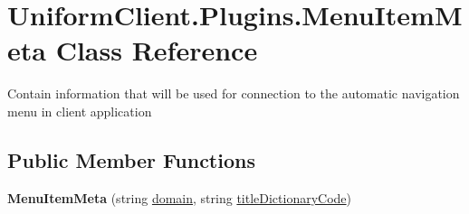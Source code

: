\hypertarget{class_uniform_client_1_1_plugins_1_1_menu_item_meta}{}\section{Uniform\+Client.\+Plugins.\+Menu\+Item\+Meta Class Reference}
\label{class_uniform_client_1_1_plugins_1_1_menu_item_meta}


Contain information that will be used for connection to the automatic navigation menu in client application  


\subsection*{Public Member Functions}
\begin{DoxyCompactItemize}
\item 
\mbox{\label{class_uniform_client_1_1_plugins_1_1_menu_item_meta_a46c285f5a810f09b9f23b2e33d0a27f1}} 
{\bfseries Menu\+Item\+Meta} (string \mbox{\hyperlink{class_uniform_client_1_1_plugins_1_1_menu_item_meta_a5af82221a6390db0d98c7fe9ff1d1985}{domain}}, string \mbox{\hyperlink{class_uniform_client_1_1_plugins_1_1_menu_item_meta_a7cd04fb564fa2bdd1ac3c0c3af3b9aab}{title\+Dictionary\+Code}})
\end{DoxyCompactItemize}
